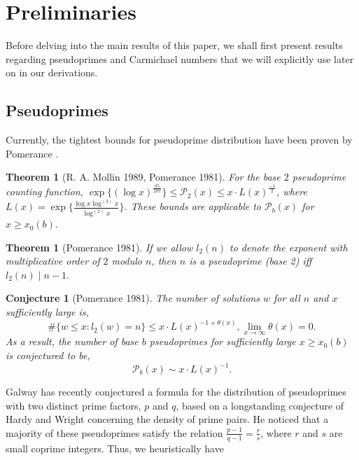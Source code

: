 \documentclass[11pt]{article}
\theoremstyle{plain}
\newtheorem{theorem}[subsubsection]{Theorem}
\newtheorem{conj}[subsubsection]{Conjecture}
\theoremstyle{definition}
\theoremstyle{remark}
\numberwithin{equation}{subsection}
\begin{document}
\section{Preliminaries}
Before delving into the main results of this paper, we shall first present results regarding pseudoprimes and Carmichael numbers that we will explicitly use later on in our derivations.
\subsection{Pseudoprimes}
Currently, the tightest bounds for pseudoprime distribution have been proven by Pomerance \cite{5} \cite{11}.
\begin{theorem}[R. A. Mollin 1989, Pomerance 1981] \label{pseudo1}
For the base $2$ pseudoprime counting function, $\exp\{(\log x)^{\frac{85}{207}}\} \le \mathscr{P}_2(x) \le x \cdot L(x)^{\frac{-1}{2}}$, where $L(x) = \exp\{\frac{\log x \log^{(3)} x}{\log^{(2)} x}\}$. These bounds are applicable to $\mathscr{P}_b(x)$ for $x \ge x_0(b)$.
\end{theorem}
\begin{theorem}[Pomerance 1981] \label{pseudo2}
If we allow $l_2(n)$ to denote the exponent with multiplicative order of $2$ modulo $n$, then $n$ is a pseudoprime \emph{(base 2)} iff $l_2(n) \mid n-1$.
\end{theorem}
\begin{conj}[Pomerance 1981] \label{pseudo3}
The number of solutions $w$ for all $n$ and $x$ sufficiently large is,
\begin{equation} \label{5}
\#\{w \le x: l_2(w) = n\} \le x \cdot {L(x)}^{-1 + \theta(x)}, \lim_{x\to\infty}\theta(x) = 0.
\end{equation}
As a result, the number of base $b$ pseudoprimes for sufficiently large $x \ge x_0(b)$ is conjectured to be,
\begin{equation} \label{6}
\mathscr{P}_b(x) \sim x \cdot {L(x)}^{-1}.
\end{equation}
\end{conj}
Galway \cite{3} has recently conjectured a formula for the distribution of pseudoprimes with two distinct prime factors, $p$ and $q$, based on a longstanding conjecture of Hardy and Wright concerning the density of prime pairs. He noticed that a majority of these pseudoprimes satisfy the relation $\frac{p - 1}{q - 1} = \frac{r}{s}$, where $r$ and $s$ are small coprime integers. Thus, we heuristically have
\end{document}
